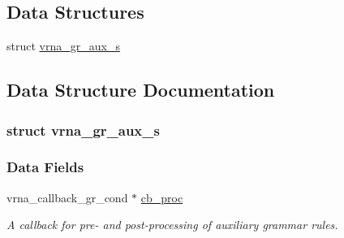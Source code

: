 \subsection*{Data Structures}
\begin{DoxyCompactItemize}
\item 
struct \hyperlink{group__grammar_structvrna__gr__aux__s}{vrna\+\_\+gr\+\_\+aux\+\_\+s}
\end{DoxyCompactItemize}


\subsection{Data Structure Documentation}
\label{structvrna__gr__aux__s}
\subsubsection{struct vrna\+\_\+gr\+\_\+aux\+\_\+s}
\subsubsection*{Data Fields}
\begin{DoxyCompactItemize}
\item 
\mbox{\label{group__grammar_ad4b601db6dc2e18854042b096ee780cc}} 
vrna\+\_\+callback\+\_\+gr\+\_\+cond $\ast$ \hyperlink{group__grammar_ad4b601db6dc2e18854042b096ee780cc}{cb\+\_\+proc}
\begin{DoxyCompactList}\small\item\em A callback for pre-\/ and post-\/processing of auxiliary grammar rules. \end{DoxyCompactList}\end{DoxyCompactItemize}
